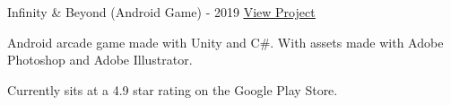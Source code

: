 \begin{cventries}
  \cventry
    {} %
    {Infinity \& Beyond (Android Game) - 2019} %
    {\href{https://play.google.com/store/apps/details?id=com.KKSGames.InifintyandBeyond}{\underline{View Project}}} %
    {} %
    {
      \begin{cvitems} %
        \item {Android arcade game made with Unity and C\#. With assets made with Adobe Photoshop and Adobe Illustrator.}
        \item {Currently sits at a 4.9 star rating on the Google Play Store.}
      \end{cvitems}
    }


\end{cventries}
